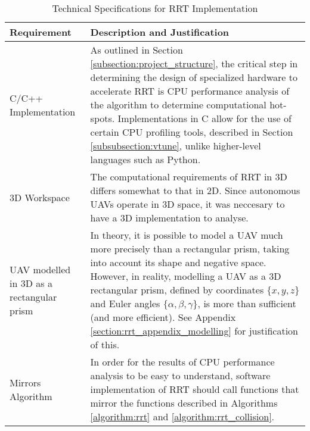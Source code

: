 \begin{table}[H]
\begin{center}
\begin{tabular}{|p{.3\linewidth}|p{.64\linewidth}|}
    \hline
    Requirement             & Description and Justification \\
    \hline
    C/C++ Implementation    & 
        As outlined in Section \ref{subsection:project_structure}, the critical step in determining the design of specialized hardware to accelerate \gls{RRT} is CPU performance analysis of the algorithm to determine computational hot-spots. Implementations in C allow for the use of certain CPU profiling tools, described in Section \ref{subsubsection:vtune}, unlike higher-level languages such as Python. \\
    \hline
    3D Workspace            & 
        The computational requirements of \gls{RRT} in \gls{3D} differs somewhat to that in \gls{2D}. Since autonomous \glspl{UAV} operate in 3D space, it was neccesary to have a \gls{3D} implementation to analyse. \\
    \hline
    \Gls{UAV} modelled in \gls{3D} as a rectangular prism  & 
        In theory, it is possible to model a \gls{UAV} much more precisely than a rectangular prism, taking into account its shape and negative space. However, in reality, modelling a \gls{UAV} as a \gls{3D} rectangular prism, defined by coordinates $\{x, y, z\}$ and Euler angles $\{\alpha, \beta, \gamma \}$, is more than sufficient (and more efficient). See Appendix \ref{section:rrt_appendix_modelling} for justification of this. \\
    \hline
    Mirrors Algorithm       & 
        In order for the results of CPU performance analysis to be easy to understand, software implementation of \gls{RRT} should call functions that mirror the functions described in Algorithms \ref{algorithm:rrt} and \ref{algorithm:rrt_collision}. \\
    \hline
\end{tabular}
\caption{Technical Specifications for \gls{RRT} Implementation}
\label{table:RRT_Tech_Specs}
\end{center}
\end{table}
